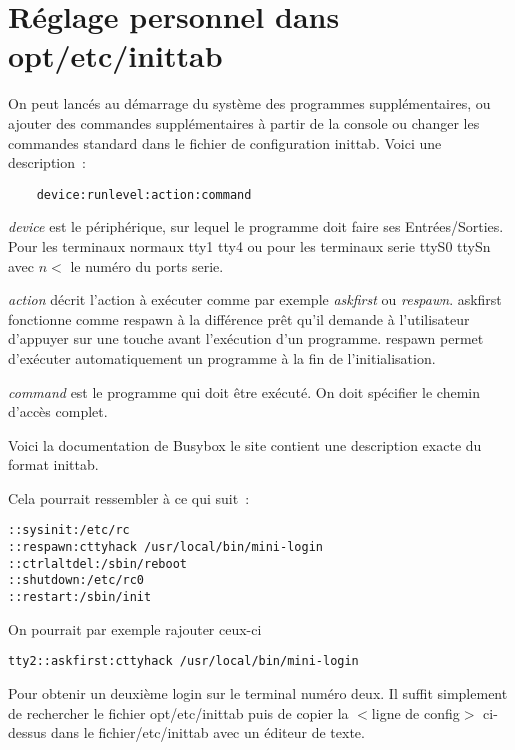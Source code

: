 
\section{Réglage personnel dans opt/etc/inittab}

  On peut lancés au démarrage du système des programmes supplémentaires,
  ou ajouter des commandes supplémentaires à partir de la console ou changer
  les commandes standard dans le fichier de configuration inittab. Voici
  une description~:

  \begin{example}
  \begin{verbatim}
    device:runlevel:action:command
  \end{verbatim}
  \end{example}

  \emph{device} est le périphérique, sur lequel le programme doit faire
  ses Entrées/Sorties. Pour les terminaux normaux tty1 tty4 ou pour les terminaux
  serie ttyS0 ttySn avec $n <$ le numéro du ports serie.

  \emph{action} décrit l'action à exécuter comme par exemple \emph{askfirst}
  ou \emph{respawn}. askfirst fonctionne comme respawn à la différence prêt
  qu'il demande à l'utilisateur d'appuyer sur une touche  avant l'exécution
  d'un programme. respawn permet d'exécuter automatiquement un programme à la fin
  de l'initialisation.

  \emph{command} est le programme qui doit être exécuté. On doit spécifier le
  chemin d'accès complet.

  Voici la documentation de Busybox  le site contient
  une description exacte du format inittab.

  Cela pourrait ressembler à ce qui suit~:

  \begin{example}
  \begin{verbatim}
::sysinit:/etc/rc
::respawn:cttyhack /usr/local/bin/mini-login
::ctrlaltdel:/sbin/reboot
::shutdown:/etc/rc0
::restart:/sbin/init
  \end{verbatim}
  \end{example}

  On pourrait par exemple rajouter ceux-ci

  \begin{example}
  \begin{verbatim}
tty2::askfirst:cttyhack /usr/local/bin/mini-login
  \end{verbatim}
  \end{example}

  Pour obtenir un deuxième login sur le terminal numéro deux. Il suffit
  simplement de rechercher le fichier opt/etc/inittab puis de copier la
  $<$ligne de config$>$ ci-dessus dans le fichier/etc/inittab avec un
  éditeur de texte.

